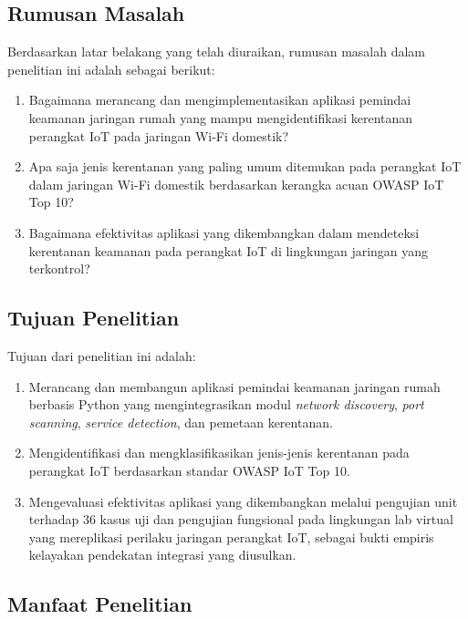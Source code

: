 \documentclass[conference]{IEEEtran}
\begin{document}
\subsection{Rumusan Masalah}

Berdasarkan latar belakang yang telah diuraikan, rumusan masalah dalam
penelitian ini adalah sebagai berikut:
\begin{enumerate}
  \item Bagaimana merancang dan mengimplementasikan aplikasi pemindai
        keamanan jaringan rumah yang mampu mengidentifikasi kerentanan
        perangkat IoT pada jaringan Wi-Fi domestik?
  \item Apa saja jenis kerentanan yang paling umum ditemukan pada
        perangkat IoT dalam jaringan Wi-Fi domestik berdasarkan kerangka
        acuan OWASP IoT Top 10?
  \item Bagaimana efektivitas aplikasi yang dikembangkan dalam mendeteksi
        kerentanan keamanan pada perangkat IoT di lingkungan jaringan
        yang terkontrol?
\end{enumerate}

\subsection{Tujuan Penelitian}

Tujuan dari penelitian ini adalah:
\begin{enumerate}
  \item Merancang dan membangun aplikasi pemindai keamanan jaringan
        rumah berbasis Python yang mengintegrasikan modul
        \textit{network discovery}, \textit{port scanning},
        \textit{service detection}, dan pemetaan kerentanan.
  \item Mengidentifikasi dan mengklasifikasikan jenis-jenis kerentanan
        pada perangkat IoT berdasarkan standar OWASP IoT Top 10.
  \item Mengevaluasi efektivitas aplikasi yang dikembangkan melalui
        pengujian unit terhadap 36 kasus uji dan pengujian fungsional
        pada lingkungan lab virtual yang mereplikasi perilaku jaringan
        perangkat IoT, sebagai bukti empiris kelayakan pendekatan
        integrasi yang diusulkan.
\end{enumerate}

\subsection{Manfaat Penelitian}
\end{document}
